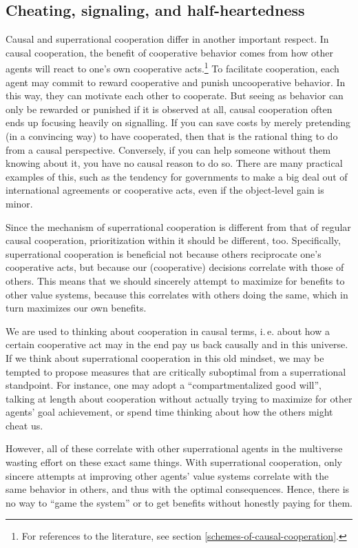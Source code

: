 \hypertarget{cheating-signaling-and-half-heartedness}{\subsection{Cheating,
signaling, and
half-heartedness}\label{cheating-signaling-and-half-heartedness}}

Causal and superrational cooperation differ in another important
respect. In causal cooperation, the benefit of cooperative behavior
comes from how other agents will react to one's own cooperative
acts.\footnote{For references to the literature, see section
  \ref{schemes-of-causal-cooperation}.} To facilitate cooperation, each agent may
commit to reward cooperative and punish uncooperative behavior. In this
way, they can motivate each other to cooperate. But seeing as behavior
can only be rewarded or punished if it is observed at all, causal
cooperation often ends up focusing heavily on signalling. If you can
save costs by merely pretending (in a convincing way) to have
cooperated, then that is the rational thing to do from a causal
perspective. Conversely, if you can help someone without them knowing
about it, you have no causal reason to do so. There are many practical
examples of this, such as the tendency for governments to make a big
deal out of international agreements or cooperative acts, even if the
object-level gain is minor.

Since the mechanism of superrational cooperation is different from that
of regular causal cooperation, prioritization within it should be
different, too. Specifically, superrational cooperation is beneficial
not because others reciprocate one's cooperative acts, but because our
(cooperative) decisions correlate with those of others. This means that
we should sincerely attempt to maximize for benefits to other value
systems, because this correlates with others doing the same, which in
turn maximizes our own benefits.

We are used to thinking about cooperation in causal terms, i.\,e. about
how a certain cooperative act may in the end pay us back causally and in
this universe. If we think about superrational cooperation in this old
mindset, we may be tempted to propose measures that are critically
suboptimal from a superrational standpoint. For instance, one may adopt
a ``compartmentalized good will'', talking at length about cooperation
without actually trying to maximize for other agents' goal achievement,
or spend time thinking about how the others might cheat us.

However, all of these correlate with other superrational agents in the
multiverse wasting effort on these exact same things. With superrational
cooperation, only sincere attempts at improving other agents' value
systems correlate with the same behavior in others, and thus with the
optimal consequences. Hence, there is no way to ``game the system'' or
to get benefits without honestly paying for them.
